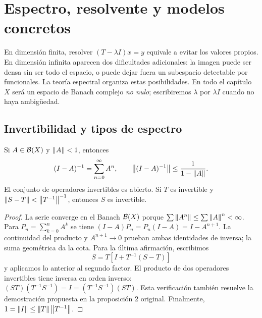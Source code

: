 \chapter{Espectro, resolvente y modelos concretos}\label{cap:v3-05}
En dimensión finita, resolver $(T-\lambda I)x=y$ equivale a evitar los valores propios. En dimensión infinita aparecen dos dificultades adicionales: la imagen puede ser densa sin ser todo el espacio, o puede dejar fuera un subespacio detectable por funcionales. La teoría espectral organiza estas posibilidades. En todo el capítulo $X$ será un espacio de Banach complejo \emph{no nulo}; escribiremos $\lambda$ por $\lambda I$ cuando no haya ambigüedad.

\section{Invertibilidad y tipos de espectro}\label{lec:v3-07}
\begin{lema}\label{v3:neumann}
Si $A\in\mathcal B(X)$ y $\left\lVert A\right\rVert<1$, entonces
\[(I-A)^{-1}=\sum_{n=0}^{\infty}A^n,\qquad
\left\lVert(I-A)^{-1}\right\rVert\le\frac1{1-\left\lVert A\right\rVert}.
\]
El conjunto de operadores invertibles es abierto. Si $T$ es invertible y $\left\lVert S-T\right\rVert<\left\lVert T^{-1}\right\rVert^{-1}$, entonces $S$ es invertible.
\end{lema}
\begin{proof}
La serie converge en el Banach $\mathcal B(X)$ porque $\sum\left\lVert A^n\right\rVert\le\sum\left\lVert A\right\rVert^n<\infty$. Para $P_n=\sum_{k=0}^nA^k$ se tiene $(I-A)P_n=P_n(I-A)=I-A^{n+1}$. La continuidad del producto y $A^{n+1}\to0$ prueban ambas identidades de inversa; la suma geométrica da la cota. Para la última afirmación, escribimos
\[S=T[I+T^{-1}(S-T)]
\]
y aplicamos lo anterior al segundo factor. El producto de dos operadores invertibles tiene inversa en orden inverso: $(ST)(T^{-1}S^{-1})=I=(T^{-1}S^{-1})(ST)$. Esta verificación también resuelve la demostración propuesta en la proposición 2 original. Finalmente, $1=\left\lVert I\right\rVert\le\left\lVert T\right\rVert\left\lVert T^{-1}\right\rVert$.
\end{proof}

